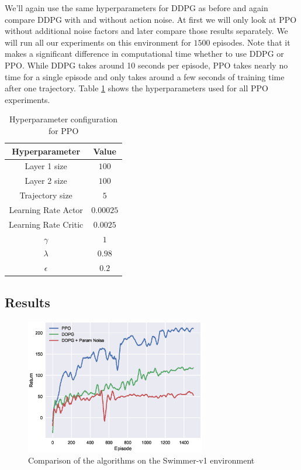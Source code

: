 We'll again use the same hyperparameters for DDPG as before and again compare DDPG with and without action noise.
At first we will only look at PPO without additional noise factors and later compare those results separately.
We will run all our experiments on this environment for $1500$ episodes.
Note that it makes a significant difference in computational time whether to use DDPG or PPO.
While DDPG takes around 10 seconds per episode, PPO takes nearly no time for a single episode and only takes around a few seconds of training time after one trajectory.
Table \ref{tb:ppo_params} shows the hyperparameters used for all PPO experiments.
\begin{table}[H]
  \centering
  \begin{tabular}{| c | c |}
      \hline
      Hyperparameter & Value\\ \hline
      Layer 1 size & $100$\\
      Layer 2 size & $100$\\
      Trajectory size & $5$\\
      Learning Rate Actor & $0.00025$\\
      Learning Rate Critic & $0.0025$\\
      $\gamma$ & $1$\\
      $\lambda$ & $0.98$\\
      $\epsilon$ & $0.2$\\
      \hline
  \end{tabular}
\caption{Hyperparameter configuration for PPO}
\label{tb:ppo_params}
\end{table}

\newpage

\subsection{Results}

\begin{figure}[H]
\centerline{
\includegraphics[width=0.7\textwidth]{images/snake_compare.eps}}
\caption{Comparison of the algorithms on the Swimmer-v1 environment}
\label{fig:snake_compare}
\end{figure}

